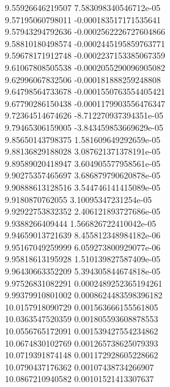 {9.55926646219507 7.583098340546712e-05 \\
9.57195060798011 -0.000183517171535641 \\
9.57943294792636 -0.0002562226727604866 \\
9.58810180498574 -0.0002445195859763771 \\
9.59678171912748 -0.0002237153385067359 \\
9.61067808505538 -0.0002055290096905082 \\
9.62996067832506 -0.000181888259248808 \\
9.64798564733678 -0.0001550763554405421 \\
9.67790286150438 -0.0001179903556476347 \\
9.72364514674626 -8.712270937394351e-05 \\
9.79465306159005 -3.843459853669629e-05 \\
9.85650143798375 1.581609649292659e-05 \\
9.88136829188028 3.087621371378191e-05 \\
9.89589020418947 3.604905577958561e-05 \\
9.90275357465697 3.686879790620878e-05 \\
9.90888613128516 3.544746141415089e-05 \\
9.9180870762055 3.10095347231254e-05 \\
9.92922753832352 2.406121893727686e-05 \\
9.9388266409444 1.566826722410042e-05 \\
9.94659013721639 8.455812348984182e-06 \\
9.95167049259999 6.059273800929077e-06 \\
9.95818613195928 1.510139827587409e-05 \\
9.96430663352209 5.394305844674818e-05 \\
9.97526831082291 0.0002489252365194261 \\
9.99379910801002 0.0008624483598396182 \\
10.0157918090729 0.001563666155561805 \\
10.0363547520359 0.001805593608878553 \\
10.0556765172091 0.001539427554234862 \\
10.0674830102769 0.001265738625079393 \\
10.0719391874148 0.001172928605228662 \\
10.0790437176362 0.00107438734266907 \\
10.0867210940582 0.00101521413307637 \\
}
